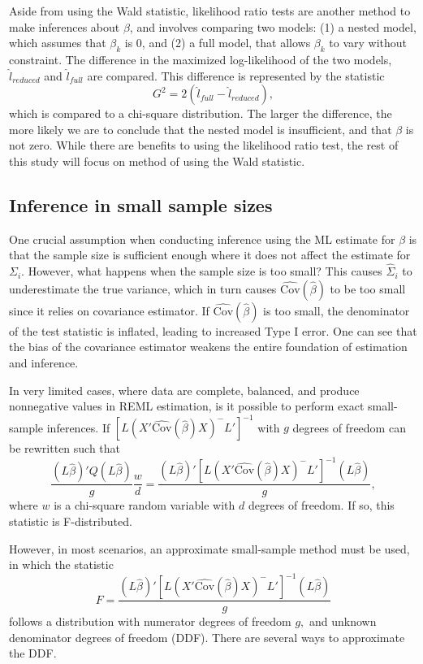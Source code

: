 \documentclass[12pt, twoside]{amherstthesis}
\begin{document}
Aside from using the Wald statistic, likelihood ratio tests are another method to make inferences about \(\beta\), and involves comparing two models: (1) a nested model, which assumes that \(\beta_k\) is 0, and (2) a full model, that allows \(\beta_k\) to vary without constraint. The difference in the maximized log-likelihood of the two models, \(\hat l_{reduced}\) and \(\hat l_{full}\) are compared. This difference is represented by the statistic \[G^2 = 2(\hat l_{full}-\hat l_{reduced}),\] which is compared to a chi-square distribution. The larger the difference, the more likely we are to conclude that the nested model is insufficient, and that \(\beta\) is not zero.
While there are benefits to using the likelihood ratio test, the rest of this study will focus on method of using the Wald statistic.

\hypertarget{inference-in-small-sample-sizes}{%
\subsection{Inference in small sample sizes}\label{inference-in-small-sample-sizes}}

One crucial assumption when conducting inference using the ML estimate for \(\beta\) is that the sample size is sufficient enough where it does not affect the estimate for \(\Sigma_i.\) However, what happens when the sample size is too small? This causes \(\hat\Sigma_i\) to underestimate the true variance, which in turn causes \(\widehat {\text{Cov}}(\hat\beta)\) to be too small since it relies on covariance estimator. If \(\widehat {\text{Cov}}(\hat\beta)\) is too small, the denominator of the test statistic is inflated, leading to increased Type I error. One can see that the bias of the covariance estimator weakens the entire foundation of estimation and inference.

In very limited cases, where data are complete, balanced, and produce nonnegative values in REML estimation, is it possible to perform exact small-sample inferences. If \([L(X'\widehat {\text{Cov}}(\hat\beta)X)^-L']^{-1}\) with \(g\) degrees of freedom can be rewritten such that \[ \frac{(L\hat\beta)'Q(L\hat\beta)}{g}\frac{w}{d} =  \frac{(L\hat\beta)'[L(X'\widehat {\text{Cov}}(\hat\beta)X)^-L']^{-1}(L\hat\beta)}{g},\] where \(w\) is a chi-square random variable with \(d\) degrees of freedom. If so, this statistic is F-distributed.

However, in most scenarios, an approximate small-sample method must be used, in which the statistic \[F = \frac{(L\hat\beta)'[L(X'\widehat {\text{Cov}}(\hat\beta)X)^-L']^{-1}(L\hat\beta)}{g}\] follows a distribution with numerator degrees of freedom \(g,\) and unknown denominator degrees of freedom (DDF). There are several ways to approximate the DDF.
\end{document}
